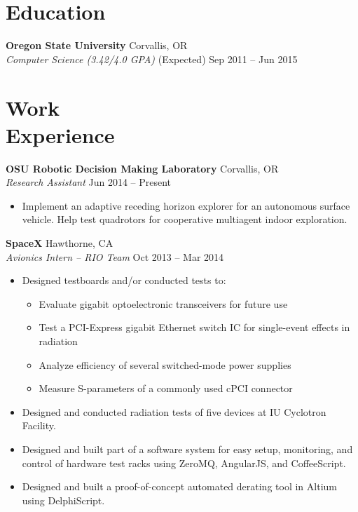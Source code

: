 \documentclass[10pt,letterpaper,margin]{res}
\begin{document}
\begin{resume}

\section{Education}

{\bf Oregon State University} \hfill {\color{lightgray} Corvallis, OR} \\
{\it Computer Science (3.42/4.0 GPA)} \hfill {\color{lightgray} (Expected) Sep 2011 -- Jun 2015}\vspace{0.0em}


\section{Work \\ Experience}

{\bf OSU Robotic Decision Making Laboratory} \hfill {\color{lightgray} Corvallis, OR} \\
{\it Research Assistant} \hfill {\color{lightgray} Jun 2014 -- Present}\vspace{0.0em}

\begin{itemize}
    \item Implement an adaptive receding horizon explorer for an autonomous
        surface vehicle. Help test quadrotors for cooperative multiagent indoor
        exploration.
\end{itemize}


{\bf SpaceX} \hfill {\color{lightgray} Hawthorne, CA} \\
{\it Avionics Intern -- RIO Team} \hfill {\color{lightgray} Oct 2013 -- Mar 2014}\vspace{0.0em}

\begin{itemize}
    \item Designed testboards and/or conducted tests to:
        \begin{itemize}
            \item Evaluate gigabit optoelectronic transceivers for future use
            \item Test a PCI-Express gigabit Ethernet switch IC for
                single-event effects in radiation
            \item Analyze efficiency of several switched-mode power supplies
            \item Measure S-parameters of a commonly used cPCI connector
        \end{itemize}
    \item Designed and conducted radiation tests of five devices at IU
        Cyclotron Facility.
    \item Designed and built part of a software system for easy setup,
        monitoring, and control of hardware test racks using ZeroMQ, AngularJS,
        and CoffeeScript.
    \item Designed and built a proof-of-concept automated derating tool in
        Altium using DelphiScript.
\end{itemize}



\end{resume}
\end{document}
